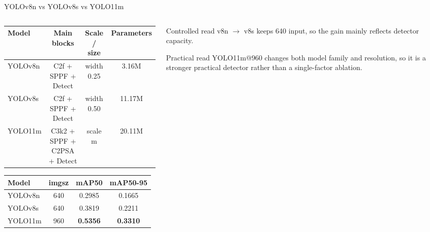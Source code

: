 \documentclass[aspectratio=169,9pt]{beamer}
\begin{document}
\begin{frame}{YOLOv8n vs YOLOv8s vs YOLO11m}
  \begin{columns}[T]
    \begin{column}{0.66\textwidth}
      \begin{table}
        \centering
        \scriptsize
        \begin{tabular}{lccc}
          \toprule
          Model & Main blocks & Scale / size & Parameters\\
          \midrule
          YOLOv8n & C2f + SPPF + Detect & width 0.25 & 3.16M\\
          YOLOv8s & C2f + SPPF + Detect & width 0.50 & 11.17M\\
          YOLO11m & C3k2 + SPPF + C2PSA + Detect & scale m & 20.11M\\
          \bottomrule
        \end{tabular}
      \end{table}
      \vspace{0.3em}
      \begin{table}
        \centering
        \scriptsize
        \begin{tabular}{lccc}
          \toprule
          Model & imgsz & mAP50 & mAP50-95\\
          \midrule
          YOLOv8n & 640 & 0.2985 & 0.1665\\
          YOLOv8s & 640 & 0.3819 & 0.2211\\
          YOLO11m & 960 & \textbf{0.5356} & \textbf{0.3310}\\
          \bottomrule
        \end{tabular}
      \end{table}
    \end{column}
    \begin{column}{0.30\textwidth}
      \begin{block}{Controlled read}
        v8n $\rightarrow$ v8s keeps 640 input, so the gain mainly reflects detector capacity.
      \end{block}
      \begin{block}{Practical read}
        YOLO11m@960 changes both model family and resolution, so it is a stronger practical detector rather than a single-factor ablation.
      \end{block}
    \end{column}
  \end{columns}
\end{frame}
\end{document}
